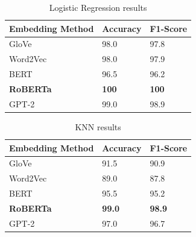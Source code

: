 \begin{table}[hbt!]
\begin{threeparttable}
\caption{Logistic Regression results}
\label{lr_results}
\begin{tabular}{lll}
\toprule
\headrow Embedding Method & Accuracy & F1-Score\\
\midrule
 GloVe    &       98.0 &       97.8 \\
 Word2Vec &       98.0 &       97.9 \\
 BERT     &       96.5 &       96.2 \\
 \textbf{RoBERTa}  &       \textbf{100} &       \textbf{100} \\
 GPT-2    &       99.0 &       98.9 \\
\bottomrule
\end{tabular}
\end{threeparttable}
\end{table}

\begin{table}[hbt!]
\begin{threeparttable}
\caption{KNN results}
\label{knn_results}
\begin{tabular}{lll}
\toprule
\headrow Embedding Method & Accuracy & F1-Score\\
\midrule
 GloVe    &       91.5 &       90.9 \\
 Word2Vec &       89.0 &       87.8 \\
 BERT     &       95.5 &       95.2 \\
 \textbf{RoBERTa}  &       \textbf{99.0} &       \textbf{98.9} \\
 GPT-2    &       97.0 &       96.7 \\
\bottomrule
\end{tabular}
\end{threeparttable}
\end{table}

